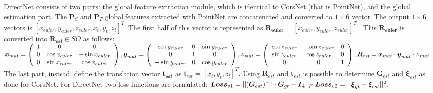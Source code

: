 DirectNet consists of two parts: the global feature extraction module,
which is identical to CorsNet (that is PointNet), and the global
estimation part. The $\boldsymbol{P}_S$ and $\boldsymbol{P}_T$
global features extracted with PointNet are concatenated and converted
to $1 \times 6$ vector. The output $1 \times 6$ vectors is
$[x_{euler}, y_{euler}, z_{euler}, x_{t}, y_{t}, z_{t}]^T$. The first
half of this vector is represented as
$\boldsymbol{R_{euler}} = [x_{euler}, y_{euler}, z_{euler}]^T$ . This
$\boldsymbol{R_{euler}}$ is converted into
$\boldsymbol{R_{est}} \in SO $ as follows:
\newline
$ \boldsymbol {x}_{mat} = \left(\begin{array}{ccc}1 & 0 & 0 \\ 0 & \cos x_{euler} & -\sin x_{euler} \\ 0 & \sin x_{euler} & \cos x_{euler} \end{array} \right), \\ \boldsymbol {y}_{mat} = \left(\begin{array}{ccc}\cos y_{euler} & 0 & \sin y_{euler} \\ 0 & 1 & 0 \\ -\sin y_{euler} & 0 & \cos y_{euler} \end{array} \right), \\ \boldsymbol {z}_{mat} = \left(\begin{array}{ccc}\cos z_{euler} & -\sin z_{euler} & 0 \\ \sin z_{euler} & \cos z_{euler} & 0 \\ 0 & 0 & 1 \end{array} \right), \\ \boldsymbol {R}_{est} = \boldsymbol {x}_{mat} \cdot \boldsymbol {y}_{mat} \cdot \boldsymbol {z}_{mat} $ 
\newline
The last part, instead, define the translation vector
$\boldsymbol{t_{est}}$ as
\newline
$ \boldsymbol {t}_{est} = [x_{t}, y_{t}, z_{t}]^{T}.$
\newline
Using $\boldsymbol {R}_{est}$ and $\boldsymbol {t}_{est}$ is
possible to determine $\boldsymbol {G}_{est}$ and
$\boldsymbol {\xi}_{est}$ as done for CorsNet. For DirectNet two loss
functions are formulated:
\newline
$ \boldsymbol {Loss}_{v1} = ||(\boldsymbol {G}_{est})^{-1}\cdot \boldsymbol {G}_{gt} - \boldsymbol {I}_{4}||_{F}. \\ \boldsymbol {Loss}_{v2} = ||\boldsymbol {\xi }_{gt}-\boldsymbol {\xi }_{est}||^{2}.$

